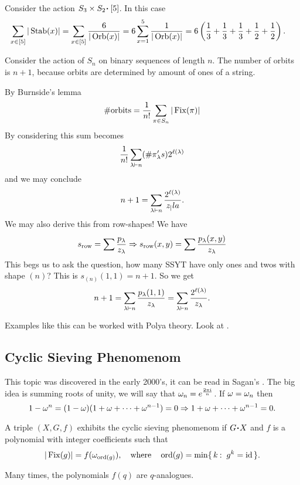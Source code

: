 \documentclass[12pt]{memoir}
\begin{document}
\begin{Ex}
    Consider the action $S_3\x S_2\.\bonj{5}$. In this case 
    \begin{align*}
        \sum_{x\in [5]}|\Stab(x)|&=\sum_{x\in [5]}\frac{6}{|\Orb(x)|}=6\sum_{x=1}^5\frac{1}{|\Orb(x)|}=6\left(\frac13+\frac13+\frac13+\half+\half\right).
    \end{align*}
\end{Ex}

\begin{Ex}
    Consider the action of $S_n$ on binary sequences of length $n$. The number of orbits is $n+1$, because orbits are determined by amount of ones of a string.\par 
    By Burnside's lemma 
    $$\#\text{orbits}=\frac{1}{n!}\sum_{\pi\in S_n}|\operatorname{Fix}(\pi)|$$
    By considering  this sum becomes 
    $$\frac{1}{n!}\sum_{\lambda\vdash n}(\# \pi_\lambda's)2^{\ell(\lambda)}$$
    and we may conclude 
    $$n+1=\sum_{\lambda\vdash n}\frac{2^{\ell(\lambda)}}{z_|la}.$$
    We may also derive this from row-shapes! We have 
    $$s_{\text{row}}=\sum \frac{p_\lambda}{z_\lambda}\Rightarrow s_{\text{row}}(x,y)=\sum \frac{p_\lambda(x,y)}{z_\lambda}$$
    This begs us to ask the question, how many SSYT have only ones and twos with shape $(n)$? This is $s_{(n)}(1,1)=n+1$. So we get 
    $$n+1=\sum_{\lambda\vdash n}\frac{p_\lambda(1,1)}{z_\lambda}=\sum_{\lambda\vdash n}\frac{2^{\ell(\lambda)}}{z_\lambda}.$$
\end{Ex}
Examples like this can be worked with Polya theory. Look at \cite{Sagan}.

\subsection{Cyclic Sieving Phenomenom}

This topic was discovered in the early 2000's, it can be read in Sagan's \cite{Sagan}. The big idea is summing roots of unity, we will say that $\omega_n=e^{\frac{2\pi i}{n}}$. If $\omega=\omega_n$ then 
$$1-\omega^n=(1-\omega)(1+\omega+\dots+\omega^{n-1})=0\Rightarrow 1+\omega+\dots+\omega^{n-1}=0.$$
\begin{Def}
    A triple $(X,G,f)$ exhibits the cyclic sieving phenomenom if $G\.X$ and $f$ is a polynomial with integer coefficients such that 
    $$|\Fix(g)|=f(\om_{\ord(g)}),\word{where}\ord(g)=\min\set{k\:\ g^k=\id}.$$
\end{Def}

Many times, the polynomials $f(q)$ are $q$-analogues. 
\end{document}

